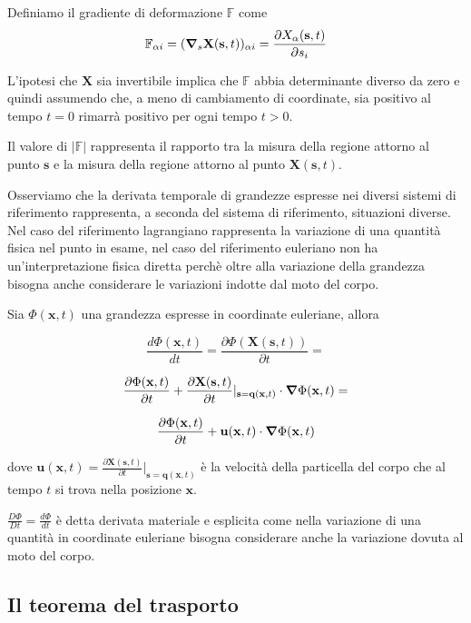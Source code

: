 Definiamo il gradiente di deformazione $\mathbb{F}$ come
\begin{equation*}  
\mathbb{F}_{\alpha i} = (\boldsymbol{\nabla}_{s}\mathbf{X}(\mathbf{s},t))_{\alpha i} = \frac{\partial X_{\alpha}(\mathbf{s},t)}{\partial s_{i}}
\end{equation*}

L'ipotesi che $\mathbf{X}$ sia invertibile implica che $\mathbb{F}$ abbia determinante diverso da zero e quindi assumendo che, a meno di cambiamento di coordinate, sia positivo al tempo $t=0$ rimarrà positivo per ogni tempo $t>0$.

Il valore di $|\mathbb{F}|$ rappresenta il rapporto tra la misura della regione attorno al punto $\mathbf{s}$ e la misura della regione attorno al punto $\mathbf{X}(\mathbf{s},t)$.

Osserviamo che la derivata temporale di grandezze espresse nei diversi sistemi di riferimento rappresenta, a seconda del sistema di riferimento, situazioni diverse.
Nel caso del riferimento lagrangiano rappresenta la variazione di una quantità fisica nel punto in esame, nel caso del riferimento euleriano non ha un'interpretazione fisica diretta perchè oltre alla variazione della grandezza bisogna anche considerare le variazioni indotte dal moto del corpo.

Sia $\Phi(\mathbf{x},t)$ una grandezza espresse in coordinate euleriane, allora

$$
\frac{d\Phi(\mathbf{x},t)}{dt} = \frac{\partial \Phi(\mathbf{X}(\mathbf{s},t))}{\partial t} = 
$$

$$
\frac{\partial \Phi(\mathbf{x},t)}{\partial t} + \frac{\partial\mathbf{X}(\mathbf{s},t)}{\partial t}|_{\mathbf{s} = 
\mathbf{q}(\mathbf{x},t)}\cdot \boldsymbol{\nabla}\Phi(\mathbf{x},t) =
$$

$$
\frac{\partial \Phi(\mathbf{x},t)}{\partial t} +
\mathbf{u}(\mathbf{x},t)\cdot \boldsymbol{\nabla}\Phi(\mathbf{x},t)
$$

dove $\mathbf{u}(\mathbf{x},t) = \frac{\partial\mathbf{X}(\mathbf{s},t)}{\partial t}|_{\mathbf{s} = \mathbf{q}(\mathbf{x},t)}$
è la velocità della particella del corpo che al tempo $t$ si trova nella posizione $\mathbf{x}$.

$\frac{D\Phi}{Dt} = \frac{d\Phi}{dt}$ è detta derivata materiale e esplicita come nella variazione di una quantità in coordinate euleriane bisogna considerare anche la variazione dovuta al moto del corpo.

\subsection{Il teorema del trasporto}

